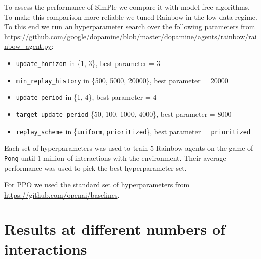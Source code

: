 To assess the performance of SimPle we compare it with model-free algorithms. To make this comparison more reliable we tuned Rainbow in the low data regime. To this end we run an hyperparameter search over the following parameters from \url{https://github.com/google/dopamine/blob/master/dopamine/agents/rainbow/rainbow_agent.py}:

\begin{itemize}
    \item \texttt{update\_horizon} in \{1, 3\}, best parameter = 3
    \item \texttt{min\_replay\_history} in \{500, 5000, 20000\}, best parameter = 20000
    \item \texttt{update\_period} in \{1, 4\}, best parameter = 4
    \item \texttt{target\_update\_period} \{50, 100, 1000, 4000\}, best parameter = 8000
    \item \texttt{replay\_scheme} in \{\texttt{uniform}, \texttt{prioritized}\}, best parameter = \texttt{prioritized}
\end{itemize}
Each set of hyperparameters was used to train $5$ Rainbow agents on the game of \texttt{Pong} until $1$ million of interactions with the environment.
Their average performance was used to pick the best hyperparameter set.

For PPO we used the standard set of hyperparameters from \url{https://github.com/openai/baselines}.

\section{Results at different numbers of interactions} \label{appdx:num_samples}

\newcommand{\mywidthappd}{3.4in}

